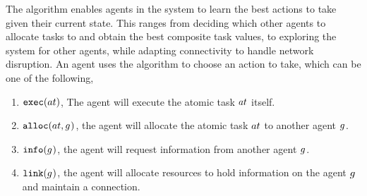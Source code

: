 The \acronymATARIA{}{} algorithm enables agents in the system to learn the best actions to take given their current state. This ranges from deciding which other agents to allocate tasks to and obtain the best composite task values, to exploring the system for other agents, while adapting connectivity to handle network disruption. An agent uses the \acronymATARIA{}{} algorithm to choose an action to take, which can be one of the following,
\begin{enumerate}
	\item $\functionExec{}{}$, The agent will execute the atomic task $\varAtomicTask{}{}$ itself.
	\item $\functionAlloc{}{}$, the agent will allocate the atomic task $\varAtomicTask{}{}$ to another agent $g_{}^{}$.
	\item $\functionInfo{}{}$, the agent will request information from another agent $g_{}^{}$.
	\item $\functionLink{}{}$, the agent will allocate resources to hold information on the agent $g_{}^{}$ and maintain a connection.
\end{enumerate}

